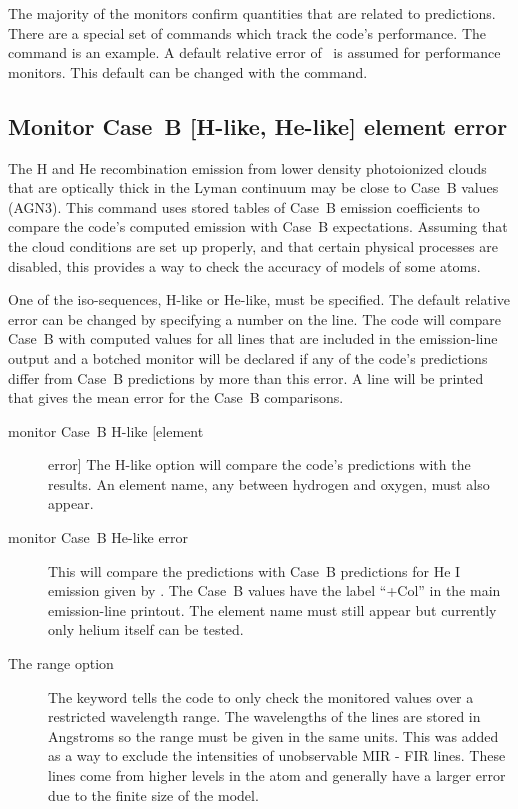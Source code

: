 The majority of the monitors confirm quantities that are related to
predictions.
There are a special set of  commands which
track the code's performance.  
The  command is an example.
A default relative error of \ErrorDefaultPerformance\ is assumed for
performance monitors.
This default can be changed with the
 command.

\subsection{Monitor Case~B [H-like, He-like]  element error}

The H and He recombination emission from lower density
photoionized clouds
that are optically thick in the Lyman continuum may be
close to Case~B values (AGN3).
This command uses stored tables of Case~B emission coefficients
to compare the code's computed emission with Case~B expectations.
Assuming that the cloud conditions are set up properly,
and that certain physical processes are disabled,
this provides a way to check the accuracy of models
of some atoms.

One of the iso-sequences, H-like or He-like, must be specified.
The default
relative error can be changed by specifying a number on the line.
The code
will compare Case~B with computed values for all lines that are included
in the emission-line output
and a botched monitor will be declared if any
of the code's predictions differ from Case~B predictions by more than this
error.
A line will be printed that gives the mean error for the Case~B
comparisons.
\begin{description}
\item[monitor Case~B H-like [element] error]  The H-like option will compare
the code's predictions with the \citet{Storey1995} results.  An element
name, any between hydrogen and oxygen, must also appear.

\item[monitor Case~B He-like error]  This will compare the predictions with Case~B predictions for He I emission given by \citet{Porter2005}.  The Case~B values have the label ``+Col'' in the main emission-line printout. The
element name must still appear but currently only helium itself can be
tested.

\item[The range option]  The keyword 
tells the code to only check the
monitored values over a restricted wavelength range.
The wavelengths of
the lines are stored in Angstroms so the range must be given in
the same units.
This was added as a way to exclude the intensities of
unobservable MIR - FIR lines.  These lines come from higher levels in the
atom and generally have a larger error due to the finite size of the model.
\end{description}

